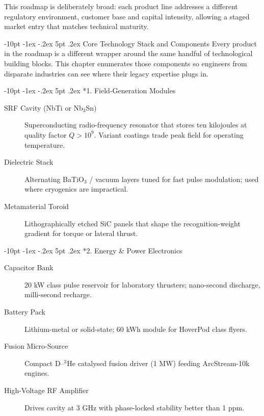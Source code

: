 \documentclass[12pt,letterpaper]{book}
\makeatletter
\renewcommand\section{\@startsection {section}{1}{\z@}%
                {-10pt \@plus -1ex \@minus -.2ex}%
                {5pt \@plus.2ex}%
                {\normalfont\large\bfseries}}
\makeatother
\begin{document}
This roadmap is deliberately broad: each product line addresses a different regulatory environment, customer base and capital intensity, allowing a staged market entry that matches technical maturity.

\section{Core Technology Stack and Components}\label{chap:components}
Every product in the roadmap is a different wrapper around the same handful of technological building blocks.  This chapter enumerates those components so engineers from disparate industries can see where their legacy expertise plugs in.

\section*{1. Field-Generation Modules}
\begin{description}
 \item[SRF Cavity (NbTi or Nb$_3$Sn)] Superconducting radio-frequency resonator that stores ten kilojoules at quality factor $Q>10^{9}$.  Variant coatings trade peak field for operating temperature.
 \item[Dielectric Stack] Alternating BaTiO$_3$ / vacuum layers tuned for fast pulse modulation; used where cryogenics are impractical.
 \item[Metamaterial Toroid] Lithographically etched SiC panels that shape the recognition-weight gradient for torque or lateral thrust.
\end{description}

\section*{2. Energy & Power Electronics}
\begin{description}
 \item[Capacitor Bank] 20 kW class pulse reservoir for laboratory thrusters; nano-second discharge, milli-second recharge.
 \item[Battery Pack] Lithium-metal or solid-state; 60 kWh module for HoverPod class flyers.
 \item[Fusion Micro-Source] Compact D–$^3$He catalysed fusion driver (1 MW) feeding ArcStream-10k engines.
 \item[High-Voltage RF Amplifier] Drives cavity at 3 GHz with phase-locked stability better than 1 ppm.
\end{description}
\end{document}
